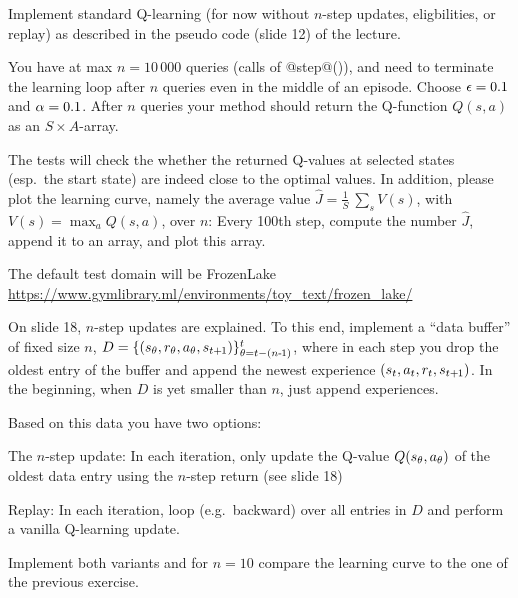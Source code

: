 Implement standard Q-learning (for now without $n$-step updates, eligbilities, or replay) as described in the pseudo code (slide 12) of the lecture. 

You have at max $n=10\,000$ queries (calls of @step@()), and need to
terminate the learning loop after $n$ queries even in the middle of an
episode. Choose $\epsilon=0.1$ and $\alpha=0.1$. After $n$ queries your method
should return the Q-function $Q(s,a)$ as an $S\times{}A$-array.

The tests will check the whether the returned Q-values at selected states
(esp.\ the start state) are indeed close to the optimal values. In
addition, please plot the learning curve, namely the average value
$\hat J = \frac{1}{S}~ \sum_s V(s)$, with $V(s)=\max_a Q(s,a)$, over
$n$: Every 100th step, compute the number $\hat J$, append it to an
array, and plot this array.

The default test domain will be FrozenLake
{\tiny\url{https://www.gymlibrary.ml/environments/toy_text/frozen_lake/}}



On slide 18, $n$-step updates are explained. To this end, implement a
``data buffer'' of fixed size $n$, $D = \{ (s_\theta, r_\theta, a_\theta,
s_{t{{\hspace*{-.0pt}\text{\rm +}\hspace*{-.5pt}}1}}) \}_{\theta=t-(n{{\hspace*{-.0pt}\text{\rm -}\hspace*{-.5pt}}1})}^t$, where in each step you drop the oldest
entry of the buffer and append the newest experience
$(s_t,a_t,r_t,s_{t{{\hspace*{-.0pt}\text{\rm +}\hspace*{-.5pt}}1}})$. In the beginning, when $D$ is yet smaller
than $n$, just append experiences.

Based on this data you have two options:
\begin{items}
\item The $n$-step update: In each iteration, only update the Q-value $Q(s_\theta,a_\theta)$ of the oldest data entry using the $n$-step return (see slide 18)
\item Replay: In each iteration, loop (e.g.\ backward) over all entries in $D$ and perform a vanilla Q-learning update.
\end{items}

Implement both variants and for $n=10$ compare the learning curve to the one of the previous exercise.



%

